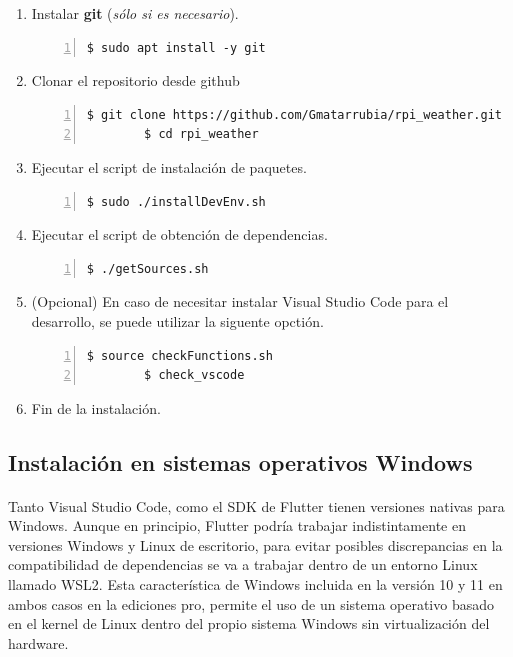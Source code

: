 \begin{enumerate}
    \item Instalar \textbf{\gls{git}} (\emph{sólo si es necesario}).
    \begin{lstlisting}[style=consola, numbers=left]
        $ sudo apt install -y git
    \end{lstlisting}

    \item Clonar el repositorio desde github
    \begin{lstlisting}[style=consola, numbers=left]
        $ git clone https://github.com/Gmatarrubia/rpi_weather.git
        $ cd rpi_weather
    \end{lstlisting}

    \item Ejecutar el script de instalación de paquetes.
    \begin{lstlisting}[style=consola, numbers=left]
        $ sudo ./installDevEnv.sh
    \end{lstlisting}

    \item Ejecutar el script de obtención de dependencias.
    \begin{lstlisting}[style=consola, numbers=left]
        $ ./getSources.sh
    \end{lstlisting}

    \item (Opcional) En caso de necesitar instalar Visual Studio Code para el desarrollo,
    se puede utilizar la siguente opctión.
    \begin{lstlisting}[style=consola, numbers=left]
        $ source checkFunctions.sh
        $ check_vscode
    \end{lstlisting}

    \item Fin de la instalación.
\end{enumerate}

\subsection{Instalación en sistemas operativos Windows}

\paragraph{}Tanto Visual Studio Code, como el \gls{SDK} de Flutter tienen versiones
nativas para Windows. Aunque en principio, Flutter podría trabajar indistintamente en
versiones Windows y Linux de escritorio, para evitar posibles discrepancias en la
compatibilidad de dependencias se va a trabajar dentro de un entorno Linux llamado
\gls{WSL2}. Esta característica de Windows incluida en la versión 10 y 11 en ambos
casos en la ediciones pro, permite el uso de un sistema operativo basado en el kernel
de Linux dentro del propio sistema Windows sin virtualización del hardware.

